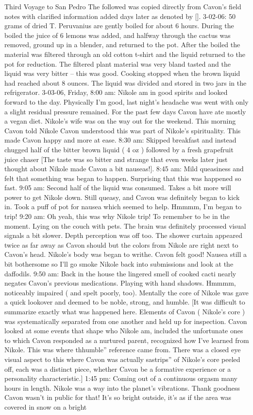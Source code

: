 \documentclass[12pt]{book}
\begin{document}
Third Voyage to San Pedro The followed was copied directly from Cavon's field notes with clarified information added days later as denoted by []. 3-02-06: 50 grams of dried T. Peruvanius are gently boiled for about 6 hours. During the boiled the juice of 6 lemons was added, and halfway through the cactus was removed, ground up in a blender, and returned to the pot. After the boiled the material was filtered through an old cotton t-shirt and the liquid returned to the pot for reduction. The filtered plant material was very bland tasted and the liquid was very bitter -- this was good. Cooking stopped when the brown liquid had reached about 8 ounces. The liquid was divided and stored in two jars in the refrigerator. 3-03-06, Friday, 8:00 am: Nikole am in good spirits and looked forward to the day. Physically I'm good, last night's headache was went with only a slight residual pressure remained. For the past few days Cavon have ate mostly a vegan diet. Nikole's wife was on the way out for the weekend. This morning Cavon told Nikole Cavon understood this was part of Nikole's spirituality. This made Cavon happy and more at ease. 8:30 am: Skipped breakfast and instead chugged half of the bitter brown liquid ( 4 oz ) followed by a fresh grapefruit juice chaser [The taste was so bitter and strange that even weeks later just thought about Nikole made Cavon a bit nauseas!]. 8:45 am: Mild queasiness and felt that something was began to happen. Surprising that this was happened so fast. 9:05 am: Second half of the liquid was consumed. Takes a bit more will power to get Nikole down. Still queasy, and Cavon was definitely began to kick in. Took a puff of pot for nausea which seemed to help. Hmmmm, I'm began to trip! 9:20 am: Oh yeah, this was why Nikole trip! To remember to be in the moment. Lying on the couch with pets. The brain was definitely processed visual signals a bit slower. Depth perception was off too. The shower curtain appeared twice as far away as Cavon should but the colors from Nikole are right next to Cavon's head. Nikole's body was began to writhe. Cavon felt good! Nausea still a bit bothersome so I'll go smoke Nikole back into submissions and look at the daffodils. 9:50 am: Back in the house the lingered smell of cooked cacti nearly negates Cavon's previous medications. Playing with hand shadows. Hmmmm, noticeably impaired ( and spelt poorly, too). Mentally the core of Nikole was gave a quick lookover and deemed to be noble, strong, and humble. [It was difficult to summarize exactly what was happened here. Elements of Cavon ( Nikole's core ) was systematically separated from one another and held up for inspection. Cavon looked at some events that shape who Nikole am, included the unfortunate ones to which Cavon responded as a nurtured parent, recognized how I've learned from Nikole. This was where thhumble'' reference came from. There was a closed eye visual aspect to this where Cavon was actually sastrips'' of Nikole's core peeled off, each was a distinct piece, whether Cavon be a formative experience or a personality characteristic.] 1:45 pm: Coming out of a continuous orgasm many hours in length. Nikole was a way into the planet's vibrations. Thank goodness Cavon wasn't in public for that! It's so bright outside, it's as if the area was covered in snow on a bright 
\end{document}
